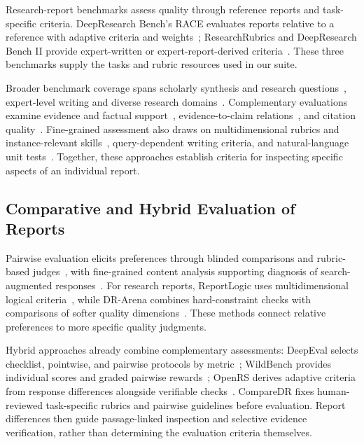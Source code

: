 \documentclass{article}
\begin{document}
Research-report benchmarks assess quality through reference reports and task-specific criteria. DeepResearch Bench's RACE evaluates reports relative to a reference with adaptive criteria and weights~\citep{drb12025}; ResearchRubrics and DeepResearch Bench II provide expert-written or expert-report-derived criteria~\citep{ResearchRubrics2025,drb22026}. These three benchmarks supply the tasks and rubric resources used in our suite.

Broader benchmark coverage spans scholarly synthesis and research questions~\citep{reportbench2025,deepscholar2025,researcherbench2025}, expert-level writing and diverse research domains~\citep{expertlongbench2025,draco2026}. Complementary evaluations examine evidence and factual support~\citep{deer2026,deepresearcheval2026}, evidence-to-claim relations~\citep{hievidr2026}, and citation quality~\citep{alce2023}. Fine-grained assessment also draws on multidimensional rubrics and instance-relevant skills~\citep{llmrubric2024,flask2023}, query-dependent writing criteria, and natural-language unit tests~\citep{writingbench2025,lmunit2024}. Together, these approaches establish criteria for inspecting specific aspects of an individual report.

\subsection{Comparative and Hybrid Evaluation of Reports}

Pairwise evaluation elicits preferences through blinded comparisons and rubric-based judges~\citep{chatbotarena2024,searcharena2025,mtbench2023,prometheus22024}, with fine-grained content analysis supporting diagnosis of search-augmented responses~\citep{arenanuggets2025}. For research reports, ReportLogic uses multidimensional logical criteria~\citep{reportlogic2026}, while DR-Arena combines hard-constraint checks with comparisons of softer quality dimensions~\citep{drarena2026}. These methods connect relative preferences to more specific quality judgments.

Hybrid approaches already combine complementary assessments: DeepEval selects checklist, pointwise, and pairwise protocols by metric~\citep{liveresearchbench2026}; WildBench provides individual scores and graded pairwise rewards~\citep{wildbench2024}; OpenRS derives adaptive criteria from response differences alongside verifiable checks~\citep{openrs2026}. CompareDR fixes human-reviewed task-specific rubrics and pairwise guidelines before evaluation. Report differences then guide passage-linked inspection and selective evidence verification, rather than determining the evaluation criteria themselves.
\end{document}
